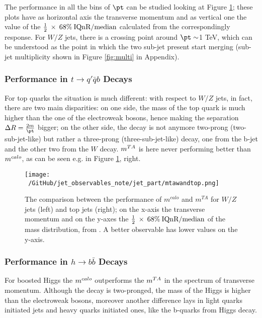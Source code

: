 The performance in all the bins of $\pt$ can be studied looking at Figure \ref{fig:mta3}; these plots have as horizontal axis the transverse momentum and as vertical one the value of the $\frac{1}{2}\: \times\: 68\% \:\textrm{IQnR/median}$ calculated from the correspondingly response. For $W/Z$ jets, there is a crossing point around $\pt\sim$1 TeV, which can be understood as the point in which the two sub-jet present start merging (sub-jet multiplicity shown in Figure \ref{fig:multi} in Appendix).



\subsubsection{Performance in $t\to q'\bar{q}b$ Decays}

For top quarks the situation is much different: with respect to $W/Z$ jets, in fact, there are two main disparities: on one side, the mass of the top quark is much higher than the one of the electroweak bosons, hence making the separation $\Delta R=\frac{2m}{\pt}$ bigger; on the other side, the decay is not anymore two-prong (two-sub-jet-like) but rather a three-prong  (three-sub-jet-like) decay, one from the b-jet and the other two from the $W$ decay.
$m^{TA}$ is here never performing better than $m^{calo}$, as can be seen e.g. in Figure \ref{fig:mta3}, right.


\begin{figure}[!ht]
  \centering
      \texttt{[image: ~/GitHub/jet\_observables\_note/jet\_part/mtawandtop.png]}
  \caption[$m^{calo}$ and $m^{TA}$ comparison for $W/Z$ jets and top jets]{The comparison between the performance of $m^{calo}$ and $m^{TA}$ for $W/Z$ jets (left) and top jets (right); on the x-axis the transverse momentum and on the y-axes the $\frac{1}{2}\: \times\: 68\% \:\textrm{IQnR/median}$ of the mass distribution, from \cite{art35}. A better observable has lower values on the y-axis. }
  \label{fig:mta3}
\end{figure}

\subsubsection{Performance in $h\to b\bar{b}$ Decays}

For boosted Higgs the $m^{calo}$ outperforms the $m^{TA}$ in the spectrum of transverse momentum. Although the decay is two-pronged, the mass of the Higgs is higher than the electroweak bosons, moreover another difference lays in light quarks initiated jets and heavy quarks initiated ones, like the b-quarks from Higgs decay.

